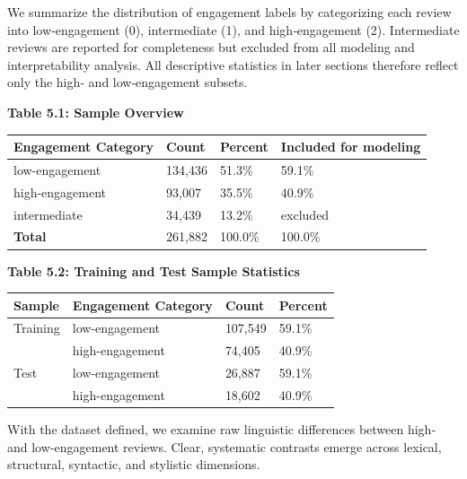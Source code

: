 We summarize the distribution of engagement labels by categorizing each
review into low‑engagement (0), intermediate (1), and high‑engagement
(2). Intermediate reviews are reported for completeness but excluded
from all modeling and interpretability analysis. All descriptive
statistics in later sections therefore reflect only the high‑ and
low‑engagement subsets.

\textbf{Table 5.1: Sample Overview}

\begin{longtable}[]{@{}llll@{}}
\toprule()
Engagement Category & Count & Percent & Included for modeling \\
\midrule()
\endhead
low-engagement & 134,436 & 51.3\% & 59.1\% \\
high-engagement & 93,007 & 35.5\% & 40.9\% \\
intermediate & 34,439 & 13.2\% & excluded \\
\textbf{Total} & 261,882 & 100.0\% & 100.0\% \\
\bottomrule()
\end{longtable}

\textbf{Table 5.2: Training and Test Sample Statistics}

\begin{longtable}[]{@{}llll@{}}
\toprule()
Sample & Engagement Category & Count & Percent \\
\midrule()
\endhead
Training & low-engagement & 107,549 & 59.1\% \\
& high-engagement & 74,405 & 40.9\% \\
Test & low-engagement & 26,887 & 59.1\% \\
& high-engagement & 18,602 & 40.9\% \\
\bottomrule()
\end{longtable}

With the dataset defined, we examine raw linguistic differences between
high‑ and low‑engagement reviews. Clear, systematic contrasts emerge
across lexical, structural, syntactic, and stylistic dimensions.


